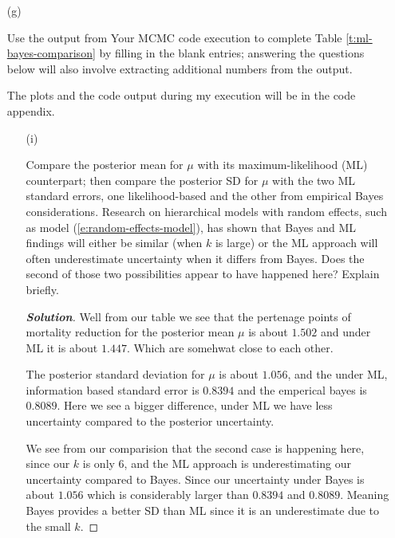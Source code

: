\documentclass[12pt]{article}
\newenvironment{solution}{\begin{tcolorbox}[breakable]\begin{proof}[\textbf{\textit{Solution}}] }{\end{proof}\end{tcolorbox}}
\begin{document}
\begin{itemize}
\item[(g)]

\textit{} \vspace*{0.025in} Use the output from Your MCMC code execution to complete Table \ref{t:ml-bayes-comparison} by filling in the blank entries; answering the questions below will also involve extracting additional numbers from the output.
\begin{tcolorbox}
    The plots and the code output during my execution will be in the code appendix. 
\end{tcolorbox}
\begin{itemize}

\item[(i)]

Compare the posterior mean for $\mu$ with its maximum-likelihood (ML) counterpart; then compare the posterior SD for $\mu$ with the two ML standard errors, one likelihood-based and the other from empirical Bayes considerations.  \textit{\fbox{\textbf{[10 points]}}} \vspace*{0.025in} Research on hierarchical models with random effects, such as model (\ref{e:random-effects-model}), has shown that Bayes and ML findings will either be similar (when $k$ is large) or the ML approach will often underestimate uncertainty when it differs from Bayes. Does the second of those two possibilities appear to have happened here? Explain briefly. \fbox{\textbf{\textit{[5 points]}}}
\begin{solution}
    Well from our table we see that the pertenage points of mortality reduction for the posterior mean $\mu$ is about $1.502$ and under ML it is about $1.447$. Which are somehwat close to each other.
    
    The posterior standard deviation for $\mu$ is about $1.056$, and the under ML, information based standard error is $0.8394$ and the emperical bayes is  $0.8089$. Here we see a bigger difference, under ML we have less uncertainty compared to the posterior uncertainty. 

    We see from our comparision that the second case is happening here, since our $k$ is only 6, and the ML approach is underestimating our uncertainty compared to Bayes. Since our uncertainty under Bayes is about $1.056$ which is considerably larger than  $0.8394$ and $0.8089$. Meaning Bayes provides a better SD than ML since it is an underestimate due to the small $k$.
    

\end{solution}
\end{itemize}
\end{itemize}
\end{document}
